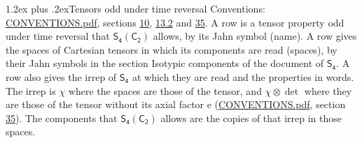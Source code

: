 \documentclass[10pt,a4paper]{article}
\makeatletter
\renewcommand\section{\@startsection{section}{1}{\z@}{-3ex plus -1ex minus -.2ex}%
  {1.2ex plus .2ex}{\normalfont\large\sffamily\bfseries\color{parttitle}}}
\numberwithin{equation}{section}
\newcommand{\grp}[1]{\mathsf{#1}}
\newcommand{\irrprod}{\otimes}
\makeatother
\begin{document}
\section{Tensors odd under time reversal}\label{s:time_odd}
Conventions: \href{../../CONVENTIONS.pdf}{CONVENTIONS.pdf}, sections \href{../../../rotation/CONVENTIONS.pdf\#conv.10}{10}, \href{../../../rotation/CONVENTIONS.pdf\#conv.13.2}{13.2} and \href{../../CONVENTIONS.pdf\#conv.35}{35}.
\leavevmode\label{n:head.name.property}A row is a tensor property odd under time reversal that $\grp{S_{4}}(\grp{C_{2}})$ allows, by its Jahn symbol (name). \label{n:head.spaces}A row gives the spaces of Cartesian tensors in which its components are read (spaces), by their Jahn symbols in the section Isotypic components of the document of \href{../../../rotation/data/pdf/S4.pdf}{$\grp{S_{4}}$}. \label{n:head.properties}A row also gives the irrep of $\grp{S_{4}}$ at which they are read and the properties in words. The irrep is $\chi$ where the spaces are those of the tensor, and $\chi \irrprod \det$ where they are those of the tensor without its axial factor e (\href{../../CONVENTIONS.pdf}{CONVENTIONS.pdf}, section \href{../../CONVENTIONS.pdf\#conv.35}{35}). The components that $\grp{S_{4}}(\grp{C_{2}})$ allows are the copies of that irrep in those spaces.
\end{document}
